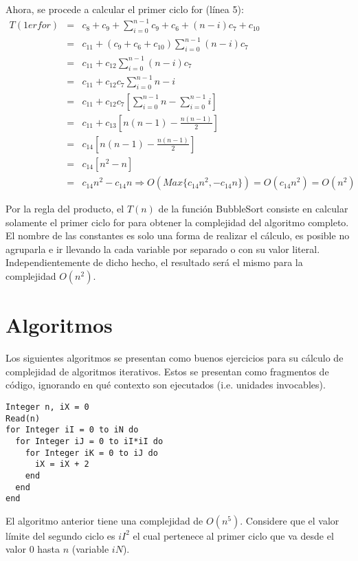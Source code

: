 Ahora, se procede a calcular el primer ciclo for (línea 5):
\begin{eqnarray*}
T(1erfor)&=&c_8 + c_9 + \sum_{i=0}^{n-1}{c_9 + c_6 + (n-i){c_7} + c_{10}}\\
&=&c_{11} + (c_9 + c_6 + c_10)\sum_{i=0}^{n-1}{(n-i)c_7}\\
&=&c_{11} + c_{12}\sum_{i=0}^{n-1}{(n-i)c_7}\\
&=&c_{11} + c_{12}c_7 \sum_{i=0}^{n-1}{n-i}\\
&=&c_{11} + c_{12}c_7 \left[ \sum_{i=0}^{n-1}{n} - \sum_{i=0}^{n-1}{i}\right]\\
&=&c_{11} + c_{13} \left[ n(n-1) - \frac{n(n-1)}{2}\right]\\
&=&c_{14} \left[ n(n-1) - \frac{n(n-1)}{2}\right]\\
&=&c_{14} \left[ n^2-n \right]\\
&=&c_{14}n^2 - c_{14}n \Rightarrow O(Max\{c_{14}n^{2}, -c_{14}n\}) = O(c_{14}n^{2}) = O(n^{2})
\end{eqnarray*}

Por la regla del producto, el $T(n)$ de la función BubbleSort consiste en calcular solamente el primer ciclo for para obtener la complejidad del algoritmo completo. El nombre de las constantes es solo una forma de realizar el cálculo, es posible no agruparla e ir llevando la cada variable por separado o con su valor literal. Independientemente de dicho hecho, el resultado será el mismo para la complejidad $O(n^{2})$.

\section{Algoritmos}

Los siguientes algoritmos se presentan como buenos ejercicios para su cálculo de complejidad de algoritmos iterativos. Estos se presentan como fragmentos de código, ignorando en qué contexto son ejecutados (i.e. unidades invocables).

\begin{lstlisting}[upquote=true, language=pseudo]
Integer n, iX = 0
Read(n)
for Integer iI = 0 to iN do
  for Integer iJ = 0 to iI*iI do
    for Integer iK = 0 to iJ do
      iX = iX + 2
    end
  end
end
\end{lstlisting}

El algoritmo anterior tiene una complejidad de $O(n^{5})$. Considere que el valor límite del segundo ciclo es $iI^{2}$ el cual pertenece al primer ciclo que va desde el valor $0$ hasta $n$ (variable $iN$).

